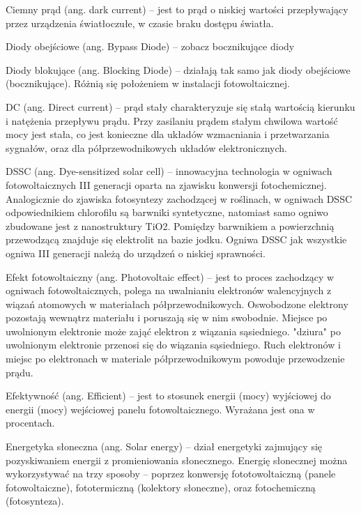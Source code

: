 \documentclass[12pt,a4paper]{article}
\begin{document}
Ciemny prąd (ang. dark current) – jest to prąd o niskiej wartości przepływający przez urządzenia światłoczułe, w czasie braku dostępu światła.


Diody obejściowe (ang. Bypass Diode) – zobacz bocznikujące diody

Diody blokujące (ang. Blocking Diode) – działają tak samo jak diody obejściowe (bocznikujące). Różnią się położeniem w instalacji fotowoltaicznej.

DC (ang. Direct current) – prąd stały charakteryzuje się stałą wartością kierunku i natężenia przepływu prądu. Przy zasilaniu prądem stałym chwilowa wartość mocy jest stała, co jest konieczne dla układów wzmacniania i przetwarzania sygnałów, oraz dla półprzewodnikowych układów elektronicznych.

DSSC (ang. Dye-sensitized solar cell) – innowacyjna technologia w ogniwach fotowoltaicznych III generacji oparta na zjawisku konwersji fotochemicznej. Analogicznie do zjawiska fotosyntezy zachodzącej w roślinach, w ogniwach DSSC odpowiednikiem chlorofilu są barwniki syntetyczne, natomiast samo ogniwo zbudowane jest z nanostruktury TiO2. Pomiędzy barwnikiem a powierzchnią przewodzącą znajduje się elektrolit na bazie jodku. Ogniwa DSSC jak wszystkie ogniwa III generacji należą do urządzeń o niskiej sprawności.

Efekt fotowoltaiczny (ang. Photovoltaic effect) – jest to proces zachodzący w ogniwach fotowoltaicznych, polega na uwalnianiu elektronów walencyjnych z wiązań atomowych w materiałach półprzewodnikowych. Oswobodzone elektrony pozostają wewnątrz materiału i poruszają się w nim swobodnie. Miejsce po uwolnionym elektronie może zająć elektron z wiązania sąsiedniego. "dziura" po uwolnionym elektronie przenosi się do wiązania sąsiedniego. Ruch elektronów i miejsc po elektronach w materiale półprzewodnikowym powoduje przewodzenie prądu.

Efektywność (ang. Efficient) – jest to stosunek energii (mocy) wyjściowej do energii (mocy) wejściowej panelu fotowoltaicznego. Wyrażana jest ona w procentach.

Energetyka słoneczna (ang. Solar energy) – dział energetyki zajmujący się pozyskiwaniem energii z promieniowania słonecznego. Energię słonecznej można wykorzystywać na trzy sposoby – poprzez konwersję fototowoltaiczną (panele fotowoltaiczne), fototermiczną (kolektory słoneczne), oraz fotochemiczną (fotosynteza).
\end{document}

